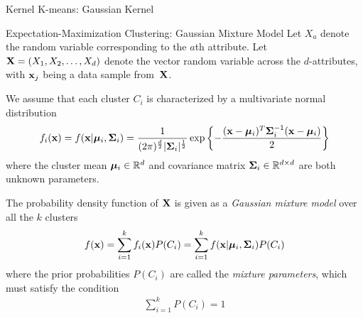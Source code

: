 \begin{frame}[fragile]{Kernel K-means: Gaussian Kernel}
\begin{center}
\begin{figure}
  \captionsetup[subfloat]{captionskip=0.25in}
    \centerline{
    }
\end{figure}
\end{center}
\end{frame}


\begin{frame}{Expectation-Maximization Clustering: Gaussian Mixture Model}
\small
  Let $X_a$ denote the random variable corresponding to
the $a$th attribute. 
Let $\mathbf{X} = (X_1, X_2, \dots, X_d)$ denote the vector random
variable across the $d$-attributes, with $\mathbf{x}_{j}$ being a data
sample from~$\mathbf{X}$.


\medskip
We assume that
each cluster $C_i$ is characterized by
a multivariate normal distribution
\begin{align*}
f_i(\mathbf{x}) = f(\mathbf{x}|{\bm \mu}_i,{\bm \Sigma}_i)
= \frac{1}{(2\pi)^\frac{d}{2}|{\bm \Sigma}_i|^\frac{1}{2}}
    \exp\left\{-\frac{(\mathbf{x}-{\bm \mu}_{i})^{T} {\bm \Sigma}_i^{-1}
    (\mathbf{x}-{\bm \mu}_{i})}{2}\right\}
\end{align*}
where the cluster mean ${\bm \mu}_i \in {\mathord{\mathbb R}}^d$ and
covariance matrix
${\bm \Sigma}_i \in {\mathord{\mathbb R}}^{d \times d}$ are both unknown parameters.


\medskip
The probability density function of $\mathbf{X}$
is given as a
{\em Gaussian mixture model} over all the $k$ clusters
\begin{align*}
    f(\mathbf{x}) = \sum_{i=1}^k f_i(\mathbf{x}) P(C_i)
    = \sum_{i=1}^k f(\mathbf{x} | {\bm \mu}_i, {\bm \Sigma}_i) P(C_i)
\end{align*}
where the prior probabilities $P(C_i)$ are called the
{\em mixture parameters}, which must satisfy the condition
\begin{align*}
    \sum_{i=1}^k P(C_i) = 1
\end{align*}


\end{frame}




